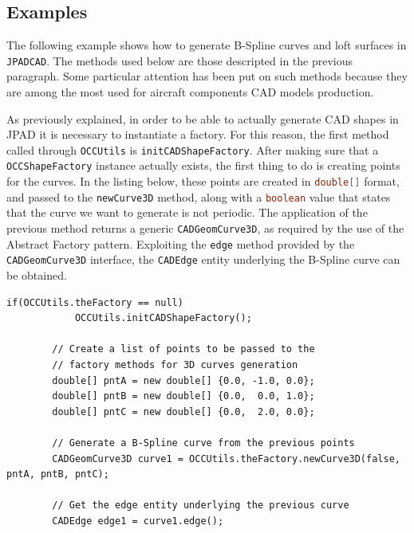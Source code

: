 \subsection{Examples}
\label{sec2.3.3}

The following example shows how to generate B-Spline curves and loft surfaces in \lstinline[language=Java]!JPADCAD!. The methods used below are those descripted in the previous paragraph. Some particular attention has been put on such methods because they are among the most used for aircraft components \gls{CAD} models production. 

\bigskip
\noindent
As previously explained, in order to be able to actually generate \gls{CAD} shapes in \gls{JPAD} it is necessary to instantiate a factory. For this reason, the first method called through \lstinline[language=Java]!OCCUtils! is \lstinline[language=Java]!initCADShapeFactory!. After making sure that a \lstinline[language=Java]!OCCShapeFactory! instance actually exists, the first thing to do is creating points for the curves. In the listing below, these points are created in \lstinline[language=Java]!double[]! format, and passed to the \lstinline[language=Java]!newCurve3D! method, along with a \lstinline[language=Java]!boolean! value that states that the curve we want to generate is not periodic. The application of the previous method returns a generic \lstinline[language=Java]!CADGeomCurve3D!, as required by the use of the Abstract Factory pattern. Exploiting the \lstinline[language=Java]!edge! method provided by the \lstinline[language=Java]!CADGeomCurve3D! interface, the \lstinline[language=Java]!CADEdge! entity underlying the B-Spline curve can be obtained.
%
\bigskip
\begin{lstlisting}[caption={B-Spline curve creation}, captionpos=b, tabsize=2, label={lst:Example1}]		
		if(OCCUtils.theFactory == null) 
			OCCUtils.initCADShapeFactory();
		
		// Create a list of points to be passed to the 
		// factory methods for 3D curves generation
		double[] pntA = new double[] {0.0, -1.0, 0.0};
		double[] pntB = new double[] {0.0,  0.0, 1.0};
		double[] pntC = new double[] {0.0,  2.0, 0.0};
		
		// Generate a B-Spline curve from the previous points
		CADGeomCurve3D curve1 = OCCUtils.theFactory.newCurve3D(false, pntA, pntB, pntC);
		
		// Get the edge entity underlying the previous curve
		CADEdge edge1 = curve1.edge();
\end{lstlisting}
%
\bigskip
\noindent
